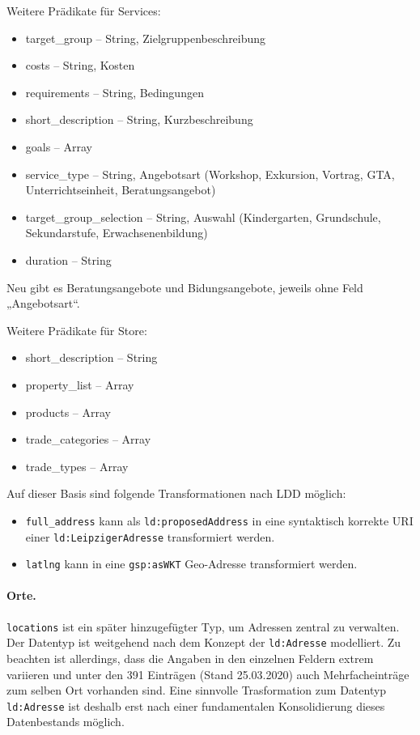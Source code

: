 \documentclass[a4paper,11pt]{article}
\begin{document}
Weitere Prädikate für Services:
\begin{itemize}\itemsep0pt
  \item target\_group -- String, Zielgruppenbeschreibung
  \item costs -- String, Kosten
  \item requirements -- String, Bedingungen
  \item short\_description -- String, Kurzbeschreibung
  \item goals -- Array
  \item service\_type -- String, Angebotsart (Workshop, Exkursion, Vortrag,
    GTA, Unterrichtseinheit, Beratungsangebot)
  \item target\_group\_selection -- String, Auswahl (Kindergarten,
    Grundschule, Sekundarstufe, Erwachsenenbildung)
  \item duration -- String
\end{itemize}
Neu gibt es Beratungsangebote und Bidungsangebote, jeweils ohne Feld
„Angebotsart“.

Weitere Prädikate für Store:
\begin{itemize}\itemsep0pt
  \item short\_description -- String
  \item property\_list -- Array
  \item products -- Array
  \item trade\_categories -- Array
  \item trade\_types -- Array
\end{itemize}

Auf dieser Basis sind folgende Transformationen nach LDD möglich:
\begin{itemize}\raggedright
\item \texttt{full\_address} kann als \texttt{ld:proposedAddress} in eine
  syntaktisch korrekte URI einer \texttt{ld:LeipzigerAdresse} transformiert
  werden. 
\item \texttt{latlng} kann in eine \texttt{gsp:asWKT} Geo-Adresse
  transformiert werden.
\end{itemize}

\paragraph{Orte.}
\texttt{locations} ist ein später hinzugefügter Typ, um Adressen zentral zu
verwalten.  Der Datentyp ist weitgehend nach dem Konzept der
\texttt{ld:Adresse} modelliert.  Zu beachten ist allerdings, dass die Angaben
in den einzelnen Feldern extrem variieren und unter den 391 Einträgen (Stand
25.03.2020) auch Mehrfacheinträge zum selben Ort vorhanden sind.  Eine
sinnvolle Trasformation zum Datentyp \texttt{ld:Adresse} ist deshalb erst nach
einer fundamentalen Konsolidierung dieses Datenbestands möglich.
\end{document}
